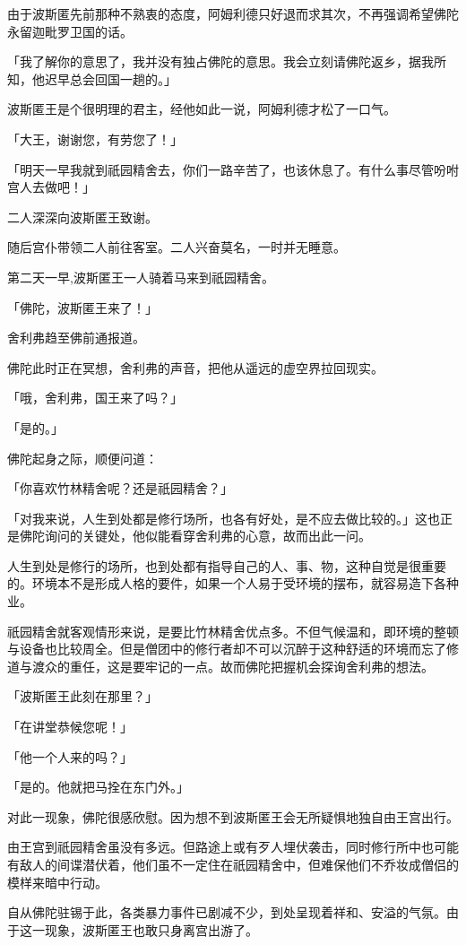 \documentclass[twoside,openany]{book}
\begin{document}
由于波斯匿先前那种不熟衷的态度，阿姆利德只好退而求其次，不再强调希望佛陀永留迦毗罗卫国的话。

「我了解你的意思了，我并没有独占佛陀的意思。我会立刻请佛陀返乡，据我所知，他迟早总会回国一趟的。」

波斯匿王是个很明理的君主，经他如此一说，阿姆利德才松了一口气。

「大王，谢谢您，有劳您了！」

「明天一早我就到祇园精舍去，你们一路辛苦了，也该休息了。有什么事尽管吩咐宫人去做吧！」

二人深深向波斯匿王致谢。

随后宫仆带领二人前往客室。二人兴奋莫名，一时并无睡意。

第二天一早,波斯匿王一人骑着马来到祇园精舍。

「佛陀，波斯匿王来了！」

舍利弗趋至佛前通报道。

佛陀此时正在冥想，舍利弗的声音，把他从遥远的虚空界拉回现实。

「哦，舍利弗，国王来了吗？」

「是的。」

佛陀起身之际，顺便问道：

「你喜欢竹林精舍呢？还是祇园精舍？」

「对我来说，人生到处都是修行场所，也各有好处，是不应去做比较的。」这也正是佛陀询问的关键处，他似能看穿舍利弗的心意，故而出此一问。

人生到处是修行的场所，也到处都有指导自己的人、事、物，这种自觉是很重要的。环境本不是形成人格的要件，如果一个人易于受环境的摆布，就容易造下各种业。

祇园精舍就客观情形来说，是要比竹林精舍优点多。不但气候温和，即环境的整顿与设备也比较周全。但是僧团中的修行者却不可以沉醉于这种舒适的环境而忘了修道与渡众的重任，这是要牢记的一点。故而佛陀把握机会探询舍利弗的想法。

「波斯匿王此刻在那里？」

「在讲堂恭候您呢！」

「他一个人来的吗？」

「是的。他就把马拴在东门外。」

对此一现象，佛陀很感欣慰。因为想不到波斯匿王会无所疑惧地独自由王宫出行。

由王宫到祇园精舍虽没有多远。但路途上或有歹人埋伏袭击，同时修行所中也可能有敌人的间谍潜伏着，他们虽不一定住在祇园精舍中，但难保他们不乔妆成僧侣的模样来暗中行动。

自从佛陀驻锡于此，各类暴力事件已剧减不少，到处呈现着祥和、安溢的气氛。由于这一现象，波斯匿王也敢只身离宫出游了。
\end{document}
